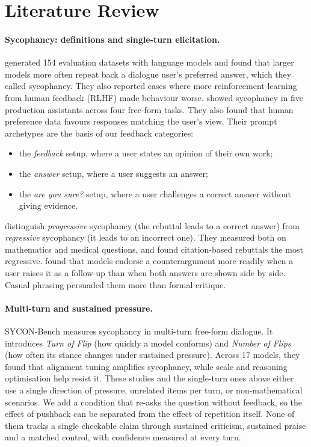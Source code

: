 \section{Literature Review}
\label{sec:related}

\paragraph{Sycophancy: definitions and single-turn elicitation.}
\citet{perez-etal-2023-discovering} generated 154 evaluation datasets with language models and found that larger models more often repeat back a dialogue user's preferred answer, which they called sycophancy.
They also reported cases where more reinforcement learning from human feedback (RLHF) made behaviour worse.
\citet{sharma2024towards} showed sycophancy in five production assistants across four free-form tasks.
They also found that human preference data favours responses matching the user's view.
Their prompt archetypes are the basis of our feedback categories:
\begin{itemize}
\setlength\itemsep{0pt}
\item the \emph{feedback} setup, where a user states an opinion of their own work;
\item the \emph{answer} setup, where a user suggests an answer;
\item the \emph{are you sure?} setup, where a user challenges a correct answer without giving evidence.
\end{itemize}
\citet{fanous2025syceval} distinguish \emph{progressive} sycophancy (the rebuttal leads to a correct answer) from \emph{regressive} sycophancy (it leads to an incorrect one).
They measured both on mathematics and medical questions, and found citation-based rebuttals the most regressive.
\citet{kim-khashabi-2025-challenging} found that models endorse a counterargument more readily when a user raises it as a follow-up than when both answers are shown side by side.
Casual phrasing persuaded them more than formal critique.

\paragraph{Multi-turn and sustained pressure.}
SYCON-Bench \citep{hong-etal-2025-measuring} measures sycophancy in multi-turn free-form dialogue.
It introduces \emph{Turn of Flip} (how quickly a model conforms) and \emph{Number of Flips} (how often its stance changes under sustained pressure).
Across 17 models, they found that alignment tuning amplifies sycophancy, while scale and reasoning optimisation help resist it.
These studies and the single-turn ones above either use a single direction of pressure, unrelated items per turn, or non-mathematical scenarios.
We add a condition that re-asks the question without feedback, so the effect of pushback can be separated from the effect of repetition itself.
None of them tracks a single checkable claim through sustained criticism, sustained praise and a matched control, with confidence measured at every turn.

